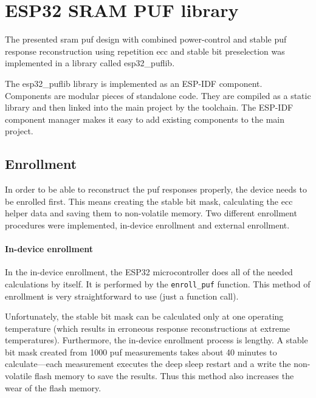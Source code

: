 \chapter{ESP32 SRAM PUF library}\label{sec:puflib}

The presented \gls{sram} \gls{puf} design with combined power-control and stable \gls{puf} response reconstruction using repetition \gls{ecc} and stable bit preselection was implemented in a library called esp32\_puflib. 

The esp32\_puflib library is implemented as an ESP-IDF component. Components are modular pieces of standalone code. They are compiled as a static library and then linked into the main project by the toolchain. The ESP-IDF component manager makes it easy to add existing components to the main project.~\cite{espidf2022}

\section{Enrollment}

In order to be able to reconstruct the \gls{puf} responses properly, the device needs to be enrolled first. This means creating the stable bit mask, calculating the \gls{ecc} helper data and saving them to non-volatile memory. Two different enrollment procedures were implemented, in-device enrollment and external enrollment.

\subsubsection*{In-device enrollment}

In the in-device enrollment, the ESP32 microcontroller does all of the needed calculations by itself. It is performed by the \lstinline{enroll_puf} function. This method of enrollment is very straightforward to use (just a function call).

Unfortunately, the stable bit mask can be calculated only at one operating temperature (which results in erroneous response reconstructions at extreme temperatures). Furthermore, the in-device enrollment process is lengthy. A stable bit mask created from 1000 \gls{puf} measurements takes about 40 minutes to calculate---each measurement executes the deep sleep restart and a write the non-volatile flash memory to save the results. Thus this method also increases the wear of the flash memory.

